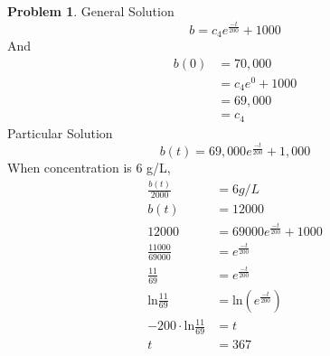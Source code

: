 \documentclass[10pt,leqno ]{article}
\theoremstyle{definition}
\newtheorem{problem}[theorem]{Problem}
\begin{document}
\begin{problem}
General Solution
\begin{equation*}
b = c_4 e^{\frac{-t}{200}} + 1000
\end{equation*}
And
\begin{align*}
b(0) &= 70,000 \\
        &= c_4 e^0 + 1000 \\
        &= 69,000\\
        &= c_4
\end{align*}
Particular Solution
\begin{equation*}
b(t) = 69,000 e^{\frac{-t}{200}} + 1,000
\end{equation*}
When concentration is 6 g/L, 
\begin{align*}
\frac{b(t)}{2000} &= 6g/L\\
b(t) &= 12000 \\
12000 &= 69000e^{\frac{-t}{200}} + 1000 \\
\frac{11000}{69000} &= e^{\frac{-t}{200}} \\
\frac{11}{69} &= e^{\frac{-t}{200}} \\
\text{ln} \frac{11}{69} &= \text{ln}(e^{\frac{-t}{200}}) \\
-200 \cdot \text{ln} \frac{11}{69} &= t \\
t &= 367
\end{align*}
\end{problem}
\end{document}
